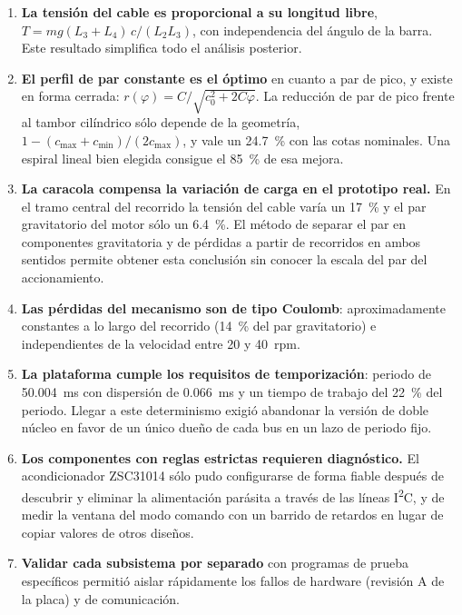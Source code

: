 \begin{enumerate}
  \item \textbf{La tensión del cable es proporcional a su longitud libre}, $T = mg(L_3+L_4)\,c/(L_2L_3)$,
        con independencia del ángulo de la barra. Este resultado simplifica todo el análisis
        posterior.
  \item \textbf{El perfil de par constante es el óptimo} en cuanto a par de pico, y existe en forma
        cerrada: $r(\varphi) = C/\sqrt{c_0^2 + 2C\varphi}$. La reducción de par de pico frente al tambor
        cilíndrico sólo depende de la geometría, $1 - (c_{\max}+c_{\min})/(2c_{\max})$, y vale un
        \SI{24.7}{\percent} con las cotas nominales. Una espiral lineal bien elegida consigue el
        \SI{85}{\percent} de esa mejora.
  \item \textbf{La caracola compensa la variación de carga en el prototipo real.} En el tramo central
        del recorrido la tensión del cable varía un \SI{17}{\percent} y el par gravitatorio del motor
        sólo un \SI{6.4}{\percent}. El método de separar el par en componentes gravitatoria y de
        pérdidas a partir de recorridos en ambos sentidos permite obtener esta conclusión sin conocer
        la escala del par del accionamiento.
  \item \textbf{Las pérdidas del mecanismo son de tipo Coulomb}: aproximadamente constantes a lo largo
        del recorrido (\SI{14}{\percent} del par gravitatorio) e independientes de la velocidad entre
        \num{20} y \SI{40}{rpm}.
  \item \textbf{La plataforma cumple los requisitos de temporización}: periodo de
        \SI{50.004}{\milli\second} con dispersión de \SI{0.066}{\milli\second} y un tiempo de trabajo
        del \SI{22}{\percent} del periodo. Llegar a este determinismo exigió abandonar la
        versión de doble núcleo en favor de un único dueño de cada bus en un lazo de periodo fijo.
  \item \textbf{Los componentes con reglas estrictas requieren diagnóstico.} El acondicionador
        ZSC31014 sólo pudo configurarse de forma fiable después de descubrir y eliminar la
        alimentación parásita a través de las líneas I\textsuperscript{2}C, y de medir la ventana del
        modo comando con un barrido de retardos en lugar de copiar valores de otros diseños.
  \item \textbf{Validar cada subsistema por separado} con programas de prueba específicos permitió
        aislar rápidamente los fallos de hardware (revisión A de la placa) y de comunicación.
\end{enumerate}


